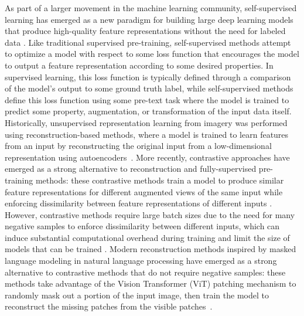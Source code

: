 As part of a larger movement in the machine learning community, self-supervised learning has emerged as a new paradigm for building large deep learning models that produce high-quality feature representations without the need for labeled data \citep{liuSelfSupervisedLearningGenerative2023}.
Like traditional supervised pre-training, self-supervised methods attempt to optimize a model with respect to some loss function that encourages the model to output a feature representation according to some desired properties.
In supervised learning, this loss function is typically defined through a comparison of the model's output to some ground truth label, while self-supervised methods define this loss function using some pre-text task where the model is trained to predict some property, augmentation, or transformation of the input data itself.
Historically, unsupervised representation learning from imagery was performed using reconstruction-based methods, where a model is trained to learn features from an input by reconstructing the original input from a low-dimensional representation using autoencoders~\citep{vincentExtractingComposingRobust2008,duStackedConvolutionalDenoising2017, xieSimMIMSimpleFramework2022}.
More recently, contrastive approaches have emerged as a strong alternative to reconstruction and fully-supervised pre-training methods: these contrastive methods train a model to produce similar feature representations for different augmented views of the same input while enforcing dissimilarity between feature representations of different inputs \citep{jaiswalSurveyContrastiveSelfSupervised2021}.
However, contrastive methods require large batch sizes due to the need for many negative samples to enforce dissimilarity between different inputs, which can induce substantial computational overhead during training and limit the size of models that can be trained \citep{chenSimpleFrameworkContrastive2020, chenWhyWeNeed2022}.
Modern reconstruction methods inspired by masked language modeling in natural language processing have emerged as a strong alternative to contrastive methods that do not require negative samples: these methods take advantage of the Vision Transformer (ViT) patching mechanism to randomly mask out a portion of the input image, then train the model to reconstruct the missing patches from the visible patches~\citep{heMaskedAutoencodersAre2022, xieSimMIMSimpleFramework2022}.
